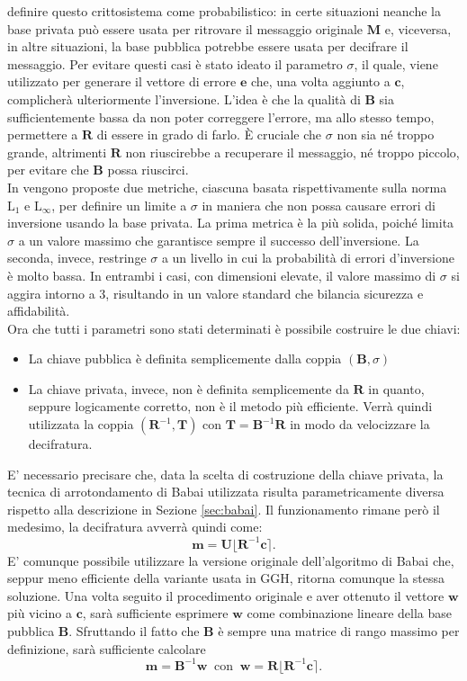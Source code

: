 definire questo crittosistema come probabilistico: in certe situazioni neanche la base
privata può essere usata per ritrovare il messaggio originale $\mathbf{M}$ e, viceversa, 
in altre situazioni, la base pubblica potrebbe essere usata per decifrare il messaggio. 
Per evitare questi casi è stato ideato il parametro $\sigma$, il 
quale, viene utilizzato per generare il vettore di errore $\mathbf{e}$ che, una volta 
aggiunto a $\mathbf{c}$, complicherà ulteriormente l'inversione. L'idea è che la
qualità di $\mathbf{B}$ sia sufficientemente bassa da non poter correggere l'errore,
ma allo stesso tempo, permettere a $\mathbf{R}$ di essere in grado di farlo. 
È cruciale che $\sigma$ non sia né troppo grande, altrimenti $\mathbf{R}$ non riuscirebbe 
a recuperare il messaggio, né troppo piccolo, per evitare che $\mathbf{B}$ possa riuscirci.
\\
In \cite[Sezione 3.2]{GGH97} vengono proposte due metriche, ciascuna basata rispettivamente
sulla norma $\text{L}_1$ e $\text{L}_\infty$, per definire un limite a
$\sigma$ in maniera che non possa causare errori di inversione usando la base privata.
La prima metrica è la più solida, poiché limita $\sigma$ a un valore massimo che garantisce 
sempre il successo dell'inversione. La seconda, invece, restringe $\sigma$ a un livello 
in cui la probabilità di errori d'inversione è molto bassa. In entrambi i casi, con 
dimensioni elevate, il valore massimo di $\sigma$ si aggira intorno a 3, risultando in un 
valore standard che bilancia sicurezza e affidabilità.
\\
Ora che tutti i parametri sono stati determinati è possibile costruire le due chiavi:
\begin{itemize}
    \item La chiave pubblica è definita semplicemente dalla coppia $(\mathbf{B}, \sigma)$
    \item La chiave privata, invece, non è definita semplicemente da $\mathbf{R}$ in quanto,
    seppure logicamente corretto, non è il metodo più efficiente. Verrà quindi utilizzata
    la coppia $(\mathbf{R}^{-1},\mathbf{T})$ con $\mathbf{T} = \mathbf{B}^{-1}\mathbf{R}$
    in modo da velocizzare la decifratura.
\end{itemize}
E' necessario precisare che, data la scelta di costruzione della chiave privata, la tecnica
di arrotondamento di Babai utilizzata risulta parametricamente diversa rispetto alla descrizione
in Sezione \ref{sec:babai}. Il funzionamento rimane però il medesimo, la decifratura avverrà
quindi come:
\[
    \mathbf{m} = \mathbf{U} \lfloor \mathbf{R}^{-1}\mathbf{c}\rceil. 
\]
E' comunque possibile utilizzare la versione originale dell'algoritmo di Babai che,
seppur meno efficiente della variante usata in GGH, ritorna comunque la stessa
soluzione. Una volta seguito il procedimento originale e aver ottenuto il vettore $\mathbf{w}$ 
più vicino a $\mathbf{c}$, sarà sufficiente esprimere 
$\mathbf{w}$ come combinazione lineare della base pubblica $\mathbf{B}$. Sfruttando il fatto
che $\mathbf{B}$ è sempre una matrice di rango massimo per definizione, sarà sufficiente calcolare
\[
    \mathbf{m} = \mathbf{B}^{-1}\mathbf{w}
    \ \text{ con } \ \mathbf{w} = \mathbf{R}\lfloor\mathbf{R}^{-1}\mathbf{c}\rceil.
\]
